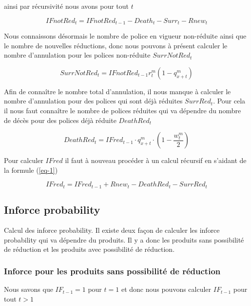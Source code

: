 \documentclass{article}
\begin{document}
ainsi par récursivité nous avons pour tout $t$

\begin{equation}
      IFnotRed_t = IFnotRed_{t-1} - Death_t - Surr_t - Rnew_t
\end{equation}

Nous connaissons désormais le nombre de police en vigueur non-réduite ainsi que le nombre de nouvelles réductions, donc nous pouvons à présent calculer le nombre d'annulation pour les polices non-réduite $SurrNotRed_t$

\begin{equation}
       SurrNotRed_t = IFnotRed_{t-1} r^m_t (1-q^m_{x+t}) 
\end{equation}

Afin de connaître le nombre total d'annulation, il nous manque à calculer le nombre d'annulation pour des polices qui sont déjà réduites $SurrRed_t$. Pour cela il nous faut connaître le nombre de polices réduites qui va dépendre du nombre de décès pour des polices déjà réduite $DeathRed_t$

\begin{equation}
       DeathRed_t = IFred_{t-1} \cdot q^m_{x+t} \cdot (1-\frac{w_t^m}{2})
\end{equation}

Pour calculer $IFred$ il faut à nouveau procéder à un calcul récursif en s'aidant de la formule (\ref{eq-1})

\begin{equation}
      IFred_t = IFred_{t-1} + Rnew_t - DeathRed_t - SurrRed_t
\end{equation}






\subsection{Inforce probability}
Calcul des inforce probability. Il existe deux façon de calculer les inforce 				probability qui va dépendre du produits. Il y a donc les produits sans possibilité 			de réduction et les produits avec possibilité de réduction.

\subsubsection{Inforce pour les produits sans possibilité de réduction}

\label{IF}
Nous savons que $IF_{t-1} = 1$ pour $t = 1$ et donc nous pouvons calculer $IF_{t-1}$ pour tout $t>1$ 
\end{document}
